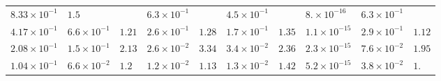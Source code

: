 \begin{tabular}{|*{1}{*{10}{|l}|}|}
$8.33\times 10^{-1}$ & $1.5$ & $\text{}$ & $6.3\times 10^{-1}$ & $\text{}$ & $4.5\times 10^{-1}$ & $\text{}$ & $8.\times 10^{-16}$ & $6.3\times 10^{-1}$ & $\text{}$ \\
$4.17\times 10^{-1}$ & $6.6\times 10^{-1}$ & $1.21$ & $2.6\times 10^{-1}$ & $1.28$ & $1.7\times 10^{-1}$ & $1.35$ & $1.1\times 10^{-15}$ & $2.9\times 10^{-1}$ & $1.12$ \\
$2.08\times 10^{-1}$ & $1.5\times 10^{-1}$ & $2.13$ & $2.6\times 10^{-2}$ & $3.34$ & $3.4\times 10^{-2}$ & $2.36$ & $2.3\times 10^{-15}$ & $7.6\times 10^{-2}$ & $1.95$ \\
$1.04\times 10^{-1}$ & $6.6\times 10^{-2}$ & $1.2$ & $1.2\times 10^{-2}$ & $1.13$ & $1.3\times 10^{-2}$ & $1.42$ & $5.2\times 10^{-15}$ & $3.8\times 10^{-2}$ & $1.$ \\
\end{tabular}
